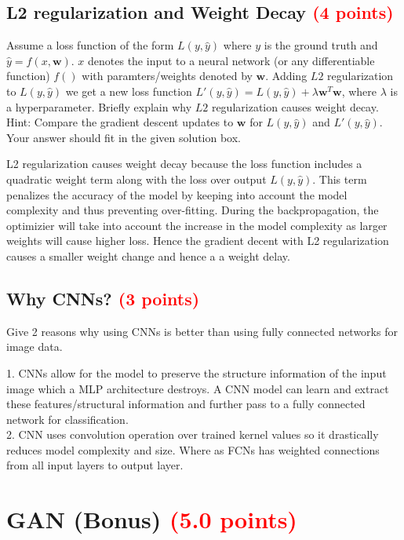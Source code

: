 \documentclass[answers]{exam}
\newcommand{\mypoints}[1]{\textcolor{red}{(#1 points)}}
\begin{document}
\subsection{L2 regularization and Weight Decay \mypoints{4}}
Assume a loss function of the form $L(y,\hat{y})$ where $y$ is the ground truth and $\hat{y} = f(x,\boldsymbol{w})$. $x$ denotes the input to a neural network (or any differentiable function) $f()$ with paramters/weights denoted by $\boldsymbol{w}$. Adding $L2$ regularization to $L(y, \hat{y})$ we get a new loss function $L'(y, \hat{y}) = L(y, \hat{y}) + \lambda \boldsymbol{w}^{T}\boldsymbol{w}$, where $\lambda$ is a hyperparameter. Briefly explain why $L2$ regularization causes weight decay. Hint: Compare the gradient descent updates to $\boldsymbol{w}$ for $L(y,\hat{y})$ and $L'(y, \hat{y})$. Your answer should fit in the given solution box.
\begin{solution}
L2 regularization causes weight decay because the loss function includes a quadratic weight term along with the loss over output $L(y,\hat{y})$. This term penalizes the accuracy of the model by keeping into account the model complexity and thus preventing over-fitting.
During the backpropagation, the optimizier will take into account the increase in the model complexity as larger weights will cause higher loss. Hence the gradient decent with L2 regularization causes a smaller weight change and hence a a weight delay. 
\end{solution}

\subsection{Why CNNs? \mypoints{3}} 
Give 2 reasons why using CNNs is better than using fully connected networks for image data.
\begin{solution}
1. CNNs allow for the model to preserve the structure information of the input image which a MLP architecture destroys. A CNN model can learn and extract these features/structural information and further pass to a fully connected network for classification.\\
2. CNN uses convolution operation over trained kernel values so it drastically reduces model complexity and size. Where as FCNs has weighted connections from all input layers to output layer.
\end{solution}

\newpage
\section{GAN (Bonus) \mypoints{5.0}}
\end{document}
